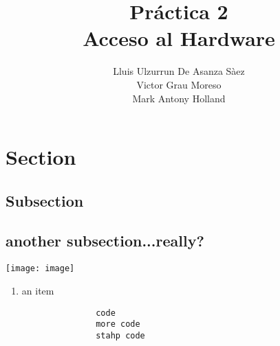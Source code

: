 \documentclass[12pt,english]{article}
\title{Práctica 2\\ Acceso al Hardware}
\author{Lluis Ulzurrun De Asanza Sàez\\Victor Grau Moreso \\Mark Antony Holland}
\date{}
\begin{document}
    \maketitle

    \tableofcontents

    \newpage
    
    \section{Section}
      
    \subsection{Subsection}
    
        
    \subsection{another subsection...really?}
    
    \begin{center}
      \texttt{[image: image]}
      \end{center}

    \begin{enumerate}
        \item an item
         \begin{verbatim}
               code
               more code
               stahp code
               \end{verbatim}
    \end{enumerate}
    
   
\end{document}
